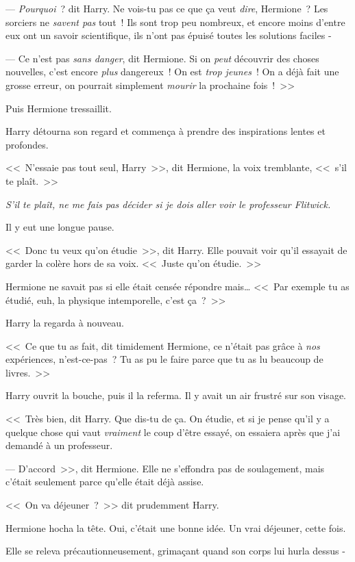 --- \emph{Pourquoi}~? dit Harry. Ne vois-tu pas ce que ça veut \emph{dire}, Hermione~? Les sorciers ne \emph{savent pas} tout~! Ils sont trop peu nombreux, et encore moins d'entre eux ont un savoir scientifique, ils n'ont pas épuisé toutes les solutions faciles -

--- Ce n'est pas \emph{sans danger}, dit Hermione. Si on \emph{peut} découvrir des choses nouvelles, c'est encore \emph{plus} dangereux~! On est \emph{trop jeunes}~! On a déjà fait une grosse erreur, on pourrait simplement \emph{mourir} la prochaine fois~!~>>

Puis Hermione tressaillit.

Harry détourna son regard et commença à prendre des inspirations lentes et profondes.

<<~N'essaie pas tout seul, Harry~>>, dit Hermione, la voix tremblante, <<~s'il te plaît.~>>

\emph{S'il te plaît, ne me fais pas décider si je dois aller voir le professeur Flitwick.}

Il y eut une longue pause.

<<~Donc tu veux qu'on étudie~>>, dit Harry. Elle pouvait voir qu'il essayait de garder la colère hors de sa voix. <<~Juste qu'on étudie.~>>

Hermione ne savait pas si elle était censée répondre mais… <<~Par exemple tu as étudié, euh, la physique intemporelle, c'est ça~?~>>

Harry la regarda à nouveau.

<<~Ce que tu as fait, dit timidement Hermione, ce n'était pas grâce à \emph{nos} expériences, n'est-ce-pas~? Tu as pu le faire parce que tu as lu beaucoup de livres.~>>

Harry ouvrit la bouche, puis il la referma. Il y avait un air frustré sur son visage.

<<~Très bien, dit Harry. Que dis-tu de ça. On étudie, et si je pense qu'il y a quelque chose qui vaut \emph{vraiment} le coup d'être essayé, on essaiera après que j'ai demandé à un professeur.

--- D'accord~>>, dit Hermione. Elle ne s'effondra pas de soulagement, mais c'était seulement parce qu'elle était déjà assise.

<<~On va déjeuner~?~>> dit prudemment Harry.

Hermione hocha la tête. Oui, c'était une bonne idée. Un vrai déjeuner, cette fois.

Elle se releva précautionneusement, grimaçant quand son corps lui hurla dessus -

